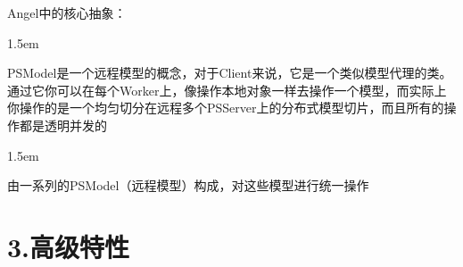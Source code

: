\documentclass{article}
\begin{document}
\noindent{}Angel中的核心抽象：%

\begin{mddefinitions}%


\begin{mdbmarginx}{}{}{}{1.5em}%
\begin{mddefdata}%
PSModel是一个远程模型的概念，对于Client来说，它是一个类似模型代理的类。通过它你可以在每个Worker上，像操作本地对象一样去操作一个模型，而实际上你操作的是一个均匀切分在远程多个PSServer上的分布式模型切片，而且所有的操作都是透明并发的
\end{mddefdata}%
\end{mdbmarginx}%


\begin{mdbmarginx}{}{}{}{1.5em}%
\begin{mddefdata}%
由一系列的PSModel（远程模型）构成，对这些模型进行统一操作%
\end{mddefdata}%
\end{mdbmarginx}%
\end{mddefinitions}%

\section{3.\hspace*{0.5em}高级特性}\label{section}%
\end{document}
